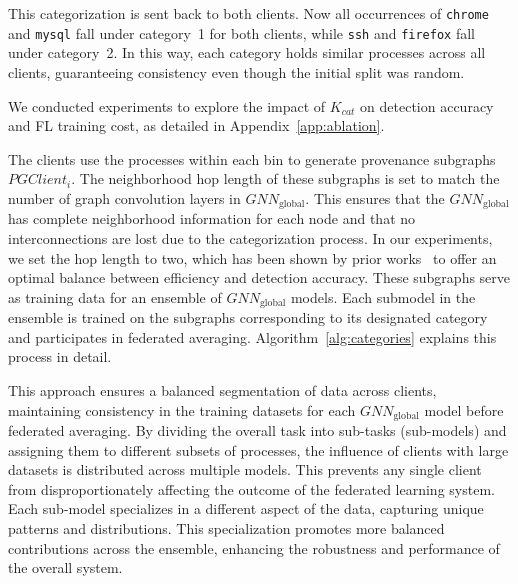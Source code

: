 This categorization is sent back to both clients. Now all occurrences of \texttt{chrome} and \texttt{mysql} fall under category~1 for both clients, while \texttt{ssh} and \texttt{firefox} fall under category~2. In this way, each category holds similar processes across all clients, guaranteeing consistency even though the initial split was random.

We conducted experiments to explore the impact of \( K_{cat} \) on detection accuracy and FL training cost, as detailed in Appendix~\ref{app:ablation}.

The clients use the processes within each bin to generate provenance subgraphs \( PGClient_{i} \). The neighborhood hop length of these subgraphs is set to match the number of graph convolution layers in \( {GNN}_{\text{global}} \). This ensures that the \({GNN}_{\text{global}}\) has complete neighborhood information for each node and that no interconnections are lost due to the categorization process. In our experiments, we set the hop length to two, which has been shown by prior works~\cite{wang2022threatrace,flash2024} to offer an optimal balance between efficiency and detection accuracy. These subgraphs serve as training data for an ensemble of \({GNN}_{\text{global}}\) models. Each submodel in the ensemble is trained on the subgraphs corresponding to its designated category and participates in federated averaging. Algorithm~\ref{alg:categories} explains this process in detail.

This approach ensures a balanced segmentation of data across clients, maintaining consistency in the training datasets for each \({GNN}_{\text{global}}\) model before federated averaging. By dividing the overall task into sub-tasks (sub-models) and assigning them to different subsets of processes, the influence of clients with large datasets is distributed across multiple models. This prevents any single client from disproportionately affecting the outcome of the federated learning system. Each sub-model specializes in a different aspect of the data, capturing unique patterns and distributions. This specialization promotes more balanced contributions across the ensemble, enhancing the robustness and performance of the overall system.


